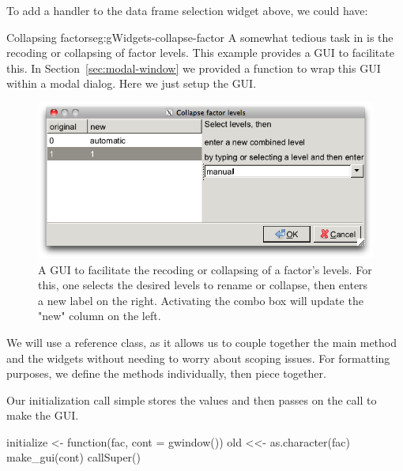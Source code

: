To add a handler to the data frame selection widget above, we could have:
\begin{Schunk}
\end{Schunk}

\begin{example}{Collapsing factors}{eg:gWidgets-collapse-factor}
A somewhat tedious task in \R{} is the recoding or collapsing of
factor levels. This example provides a GUI to facilitate this. In
Section~\ref{sec:modal-window} we provided a function to wrap this
GUI within a modal dialog. Here we just setup the GUI. 

 \begin{figure}
   \centering
   \includegraphics[width=.8\textwidth]{fig-gWidgets-collapse-factor.png}
   \caption{A GUI to facilitate the recoding or collapsing of a factor's levels. For this, one selects the desired levels to rename or collapse, then enters a new label on the right. Activating the combo box will update the "new" column on the left.}
   \label{fig:gWidgets-collapse-factor}
  \end{figure}
  
  
  We will use a reference class, as it allows us to couple together
  the main method and the widgets without needing to worry about
  scoping issues. For formatting purposes, we define the methods
  individually, then piece together.
  
  Our initialization call simple stores the values and then passes on
  the call to make the GUI.
\begin{Schunk}
\begin{Sinput}
 initialize <- function(fac, cont = gwindow()) {
   old <<- as.character(fac)
   make_gui(cont)
   callSuper()
 }
\end{Sinput}
\end{Schunk}


\end{example}
